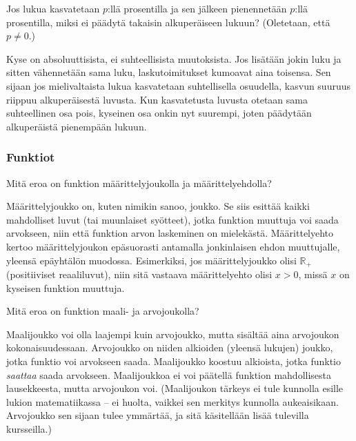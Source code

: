 \begin{multicols}{2}
\begin{tehtava}
Jos lukua kasvatetaan $p$:llä prosentilla ja sen jälkeen pienennetään $p$:llä prosentilla, miksi ei päädytä takaisin alkuperäiseen lukuun? (Oletetaan, että $p\neq 0$.)
	\begin{vastaus}
	Kyse on absoluuttisista, ei suhteellisista muutoksista. Jos lisätään jokin luku ja sitten vähennetään sama luku, laskutoimitukset kumoavat aina toisensa. Sen sijaan jos mielivaltaista lukua kasvatetaan suhtellisella osuudella, kasvun suuruus riippuu alkuperäisestä luvusta. Kun kasvatetusta luvusta otetaan sama suhteellinen osa pois, kyseinen osa onkin nyt suurempi, joten päädytään alkuperäistä pienempään lukuun.
	\end{vastaus}
\end{tehtava}

\subsubsection*{Funktiot}

\begin{tehtava}
Mitä eroa on funktion määrittelyjoukolla ja määrittelyehdolla?
\begin{vastaus}
Määrittelyjoukko on, kuten nimikin sanoo, joukko. Se siis esittää kaikki mahdolliset luvut (tai muunlaiset syötteet), jotka funktion muuttuja voi saada arvokseen, niin että funktion arvon laskeminen on mielekästä. Määrittelyehto kertoo määrittelyjoukon epäsuorasti antamalla jonkinlaisen ehdon muuttujalle, yleensä epäyhtälön muodossa. Esimerkiksi, jos määrittelyjoukko olisi $\mathbb{R}_+$ (positiiviset reaaliluvut), niin sitä vastaava määrittelyehto olisi $x>0$, missä $x$ on kyseisen funktion muuttuja.
\end{vastaus}
\end{tehtava}

\begin{tehtava}
Mitä eroa on funktion maali- ja arvojoukolla?
	\begin{vastaus}
Maalijoukko voi olla laajempi kuin arvojoukko, mutta sisältää aina arvojoukon kokonaisuudessaan. Arvojoukko on niiden alkioiden (yleensä lukujen) joukko, jotka funktio voi arvokseen saada. Maalijoukko koostuu alkioista, jotka funktio \textit{saattaa} saada arvokseen. Maalijoukkoa ei voi päätellä funktion mahdollisesta lausekkeesta, mutta arvojoukon voi. (Maalijoukon tärkeys ei tule kunnolla esille lukion matematiikassa -- ei huolta, vaikkei sen merkitys kunnolla aukeaisikaan. Arvojoukko sen sijaan tulee ymmärtää, ja sitä käsitellään lisää tulevilla kursseilla.)
	\end{vastaus}
\end{tehtava}

\end{multicols}

